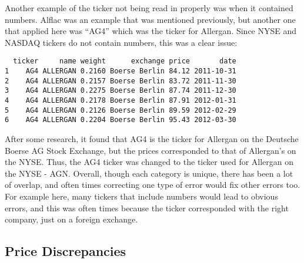\documentclass[12pt,twoside]{reedthesis}
\theoremstyle{definition}
\theoremstyle{definition}
\theoremstyle{definition}
\theoremstyle{remark}
\begin{document}
Another example of the ticker not being read in properly was when it
contained numbers. Alflac was an example that was mentioned previously,
but another one that applied here was ``AG4'' which was the ticker for
Allergan. Since NYSE and NASDAQ tickers do not contain numbers, this was
a clear issue:
\begin{verbatim}
  ticker     name weight      exchange price       date
1    AG4 ALLERGAN 0.2160 Boerse Berlin 84.12 2011-10-31
2    AG4 ALLERGAN 0.2157 Boerse Berlin 83.72 2011-11-30
3    AG4 ALLERGAN 0.2275 Boerse Berlin 87.74 2011-12-30
4    AG4 ALLERGAN 0.2178 Boerse Berlin 87.91 2012-01-31
5    AG4 ALLERGAN 0.2126 Boerse Berlin 89.59 2012-02-29
6    AG4 ALLERGAN 0.2204 Boerse Berlin 95.43 2012-03-30
\end{verbatim}
After some research, it found that AG4 is the ticker for Allergan on the
Deutsche Boerse AG Stock Exchange, but the prices corresponded to that
of Allergan's on the NYSE. Thus, the AG4 ticker was changed to the
ticker used for Allergan on the NYSE - AGN. Overall, though each
category is unique, there has been a lot of overlap, and often times
correcting one type of error would fix other errors too. For example
here, many tickers that include numbers would lead to obvious errors,
and this was often times because the ticker corresponded with the right
company, just on a foreign exchange.

\subsection{Price Discrepancies}\label{price-discrepancies}
\end{document}
